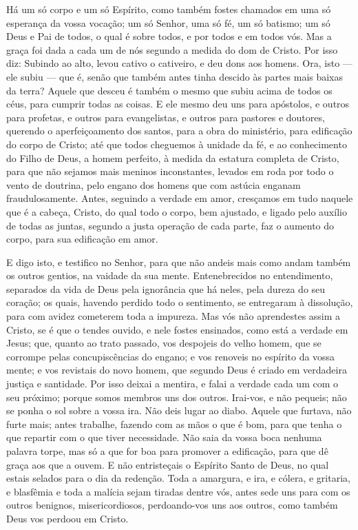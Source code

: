 Há um só corpo e um só Espírito, como também fostes chamados em
uma só esperança da vossa vocação; um só Senhor, uma só fé, um
só batismo; um só Deus e Pai de todos, o qual é sobre todos, e
por todos e em todos vós. Mas a graça foi dada a cada um de nós
segundo a medida do dom de Cristo. Por isso diz: Subindo ao
alto, levou cativo o cativeiro, e deu dons aos homens. Ora, isto
--- ele subiu --- que é, senão que também antes tinha descido às
partes mais baixas da terra? Aquele que desceu é também o
mesmo que subiu acima de todos os céus, para cumprir todas as
coisas. E ele mesmo deu uns para apóstolos, e outros para
profetas, e outros para evangelistas, e outros para pastores e
doutores, querendo o aperfeiçoamento dos santos, para a obra
do ministério, para edificação do corpo de Cristo; até que
todos cheguemos à unidade da fé, e ao conhecimento do Filho de Deus,
a homem perfeito, à medida da estatura completa de Cristo,
para que não sejamos mais meninos inconstantes, levados em
roda por todo o vento de doutrina, pelo engano dos homens que com
astúcia enganam fraudulosamente. Antes, seguindo a verdade em
amor, cresçamos em tudo naquele que é a cabeça, Cristo, do
qual todo o corpo, bem ajustado, e ligado pelo auxílio de todas as
juntas, segundo a justa operação de cada parte, faz o aumento do
corpo, para sua edificação em amor.

E digo isto, e testifico no Senhor, para que não andeis mais como
andam também os outros gentios, na vaidade da sua mente.
Entenebrecidos no entendimento, separados da vida de Deus
pela ignorância que há neles, pela dureza do seu coração; os
quais, havendo perdido todo o sentimento, se entregaram à
dissolução, para com avidez cometerem toda a impureza. Mas
vós não aprendestes assim a Cristo, se é que o tendes ouvido,
e nele fostes ensinados, como está a verdade em Jesus; que,
quanto ao trato passado, vos despojeis do velho homem, que se
corrompe pelas concupiscências do engano; e vos renoveis no
espírito da vossa mente; e vos revistais do novo homem, que
segundo Deus é criado em verdadeira justiça e santidade. Por
isso deixai a mentira, e falai a verdade cada um com o seu próximo;
porque somos membros uns dos outros. Irai-vos, e não pequeis;
não se ponha o sol sobre a vossa ira. Não deis lugar ao
diabo. Aquele que furtava, não furte mais; antes trabalhe,
fazendo com as mãos o que é bom, para que tenha o que repartir com o
que tiver necessidade. Não saia da vossa boca nenhuma palavra
torpe, mas só a que for boa para promover a edificação, para que dê
graça aos que a ouvem. E não entristeçais o Espírito Santo de
Deus, no qual estais selados para o dia da redenção. Toda a
amargura, e ira, e cólera, e gritaria, e blasfêmia e toda a malícia
sejam tiradas dentre vós, antes sede uns para com os outros
benignos, misericordiosos, perdoando-vos uns aos outros, como também
Deus vos perdoou em Cristo.

